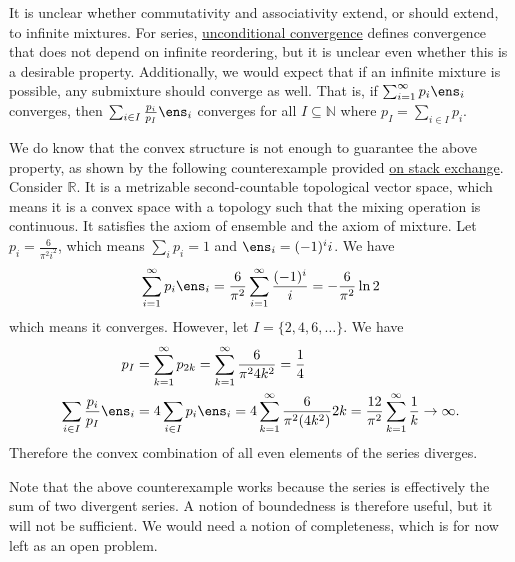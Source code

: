 It is unclear whether commutativity and associativity extend, or should extend, to infinite mixtures. For series, \href{https://en.wikipedia.org/wiki/Unconditional_convergence}{unconditional convergence} defines convergence that does not depend on infinite reordering, but it is unclear even whether this is a desirable property. Additionally, we would expect that if an infinite mixture is possible, any submixture should converge as well. That is, if $\sum_{i=1}^{\infty} p_i \ens_i$ converges, then $\sum_{i \in I} \frac{p_i}{p_I} \ens_i$ converges for all $I \subseteq \mathbb{N}$ where $p_I = \sum_{i \in I} p_i$.


We do know that the convex structure is not enough to guarantee the above property, as shown by the following counterexample provided \href{https://math.stackexchange.com/questions/5085283/does-a-convex-subcombination-of-a-convergent-convex-combination-converge}{on stack exchange}. Consider $\mathbb{R}$. It is a metrizable second-countable topological vector space, which means it is a convex space with a topology such that the mixing operation is continuous. It satisfies the axiom of ensemble and the axiom of mixture. Let $p_i = \frac{6}{\pi^2 i^2}$, which means $\sum_i p_i = 1$ and $\ens_i = (-1)^i i$. We have
\begin{equation*}
	\sum_{i=1}^{\infty} p_i \ens_i = \frac{6}{\pi^2} \sum_{i=1}^{\infty} \frac{(-1)^i}{i} = - \frac{6}{\pi^2} \ln 2
\end{equation*}
which means it converges. However, let $I = \{2,4,6,\dots\}$. We have
\begin{equation*}
	\begin{aligned}
		p_I &= \sum_{k=1}^{\infty} p_{2k} = \sum_{k=1}^{\infty} \frac{6}{\pi^2 4 k^2} = \frac{1}{4} \\
		\sum_{i \in I} \frac{p_i}{p_I} \ens_i &= 4 \sum_{i \in I} p_i \ens_i = 4 \sum_{k=1}^{\infty} \frac{6}{\pi^2 (4k^2)} 2k = \frac{12}{\pi^2} \sum_{k=1}^{\infty} \frac{1}{k} \to \infty.
	\end{aligned}
\end{equation*}
Therefore the convex combination of all even elements of the series diverges.

Note that the above counterexample works because the series is effectively the sum of two divergent series. A notion of boundedness is therefore useful, but it will not be sufficient. We would need a notion of completeness, which is for now left as an open problem. 

